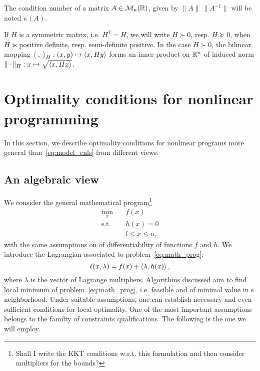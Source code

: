 \documentclass[10pt]{article}
\numberwithin{equation}{section}
\begin{document}
	The condition number of a matrix $A\in {\mathcal{M}}_n({\mathbb{R}})$, given by $\|A\|\ \|A^{-1}\|$ will be noted $\kappa(A)$. 
	
	If $H$ is a symmetric matrix, i.e. $H^T=H$, we will write $H \succ 0$, resp. $H \succeq 0$, when $H$ is positive definite, resp. semi-definite positive. In the case $H\succ 0$, the bilinear mapping $\left\langle {\cdot} , {\cdot} \right\rangle_H:(x,y) \mapsto \left\langle {x} , {Hy} \right\rangle $ forms an inner product on ${\mathbb{R}}^n$ of induced norm $\|\cdot\|_H:x\mapsto \sqrt{\left\langle {x} , {Hx} \right\rangle}$.
	
	
	\section{Optimality conditions for nonlinear programming}\label{sec:nlp_optimality_conditions}
	
	In this section, we describe optimality conditions for nonlinear programs more general than~\eqref{eq:model_cnls} from different views.
	
	\subsection{An algebraic view}
	
	We consider the general mathematical program\footnote{Shall I write the KKT conditions w.r.t. this formulation and then consider multipliers for the bounds?}
	\begin{equation}
		\label{eq:math_prog}
		\begin{aligned}
			\min_x \quad & f(x) \\
			\text{s.t.} \quad & h(x)=0 \\
			& l \le x \le u,
		\end{aligned}
	\end{equation}
	with the same assumptions on of differentiability of functions $f$ and \(h\). We introduce the Lagrangian associated to problem~\eqref{eq:math_prog}:
	\begin{equation}
		\label{eq:lagrangian}
		\ell(x,\lambda) = f(x) + \left\langle {\lambda} , {h(x)} \right\rangle,
	\end{equation}
	where $\lambda$ is the vector of Lagrange multipliers. Algorithms discussed aim to find local minimum of problem~\eqref{eq:math_prog}, i.e. feasible and of minimal value in s neighborhood. Under suitable assumptions, one can establish necessary and even sufficient conditions for local optimality. One of the most important assumptions belongs to the familty of constraints qualifications. The following is the one we will employ.
	
\end{document}

